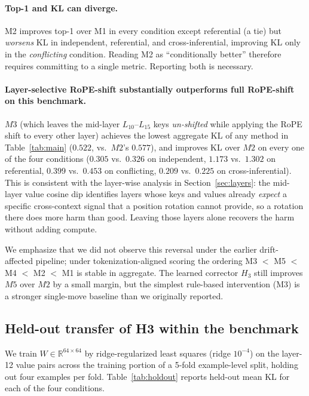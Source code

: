 \documentclass[11pt]{article}
\begin{document}
\paragraph{Top-1 and KL can diverge.} M2 improves top-1 over M1 in every condition except referential (a tie) but \emph{worsens} KL in independent, referential, and cross-inferential, improving KL only in the \emph{conflicting} condition. Reading M2 as ``conditionally better'' therefore requires committing to a single metric. Reporting both is necessary.

\paragraph{Layer-selective RoPE-shift substantially outperforms full RoPE-shift on this benchmark.} $M3$ (which leaves the mid-layer $L_{10}$--$L_{15}$ keys \emph{un-shifted} while applying the RoPE shift to every other layer) achieves the lowest aggregate KL of any method in Table~\ref{tab:main} ($0.522$, vs.\ $M2$'s $0.577$), and improves KL over $M2$ on every one of the four conditions ($0.305$ vs.\ $0.326$ on independent, $1.173$ vs.\ $1.302$ on referential, $0.399$ vs.\ $0.453$ on conflicting, $0.209$ vs.\ $0.225$ on cross-inferential). This is consistent with the layer-wise analysis in Section~\ref{sec:layers}: the mid-layer value cosine dip identifies layers whose keys and values already \emph{expect} a specific cross-context signal that a position rotation cannot provide, so a rotation there does more harm than good. Leaving those layers alone recovers the harm without adding compute.

We emphasize that we did not observe this reversal under the earlier drift-affected pipeline; under tokenization-aligned scoring the ordering M3 $<$ M5 $<$ M4 $<$ M2 $<$ M1 is stable in aggregate. The learned corrector $H_3$ still improves $M5$ over $M2$ by a small margin, but the simplest rule-based intervention (M3) is a stronger single-move baseline than we originally reported.

\subsection{Held-out transfer of H3 within the benchmark}\label{sec:holdout}

We train $W \in \mathbb{R}^{64\times64}$ by ridge-regularized least squares (ridge $10^{-4}$) on the layer-12 value pairs across the training portion of a 5-fold example-level split, holding out four examples per fold. Table~\ref{tab:holdout} reports held-out mean KL for each of the four conditions.
\end{document}
